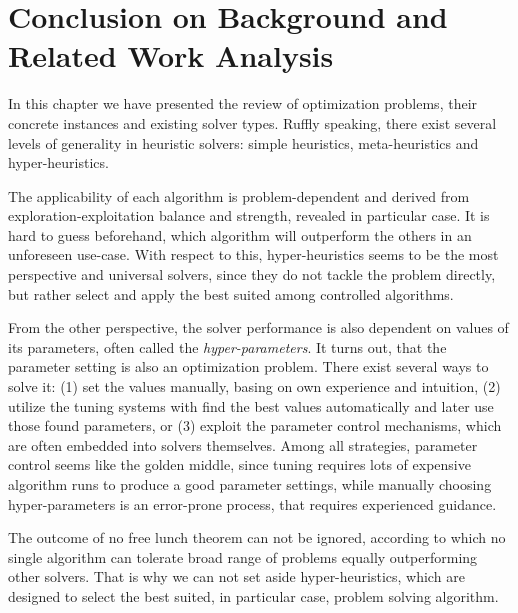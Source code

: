 \section{Conclusion on Background and Related Work Analysis}\label{bg: conclusion}
In this chapter we have presented the review of optimization problems, their concrete instances and existing solver types.
Ruffly speaking, there exist several levels of generality in heuristic solvers: simple heuristics, meta-heuristics and hyper-heuristics.

The applicability of each algorithm is problem-dependent and derived from exploration-exploitation balance and strength, revealed in particular case.
It is hard to guess beforehand, which algorithm will outperform the others in an unforeseen use-case.
With respect to this, hyper-heuristics seems to be the most perspective and universal solvers, since they do not tackle the problem directly, but rather select and apply the best suited among controlled algorithms.

From the other perspective, the solver performance is also dependent on values of its parameters, often called the \textit{hyper-parameters}.
It turns out, that the parameter setting is also an optimization problem.
There exist several ways to solve it: (1) set the values manually, basing on own experience and intuition, (2) utilize the tuning systems with find the best values automatically and later use those found parameters, or (3) exploit the parameter control mechanisms, which are often embedded into solvers themselves. 
Among all strategies, parameter control seems like the golden middle, since tuning requires lots of expensive algorithm runs to produce a good parameter settings, while manually choosing hyper-parameters is an error-prone process, that requires experienced guidance.

The outcome of no free lunch theorem can not be ignored, according to which no single algorithm can tolerate broad range of problems equally outperforming other solvers. That is why we can not set aside hyper-heuristics, which are designed to select the best suited, in particular case, problem solving algorithm.

